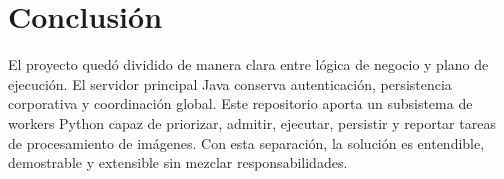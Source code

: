 \documentclass[11pt]{article}
\begin{document}
\section{Conclusión}
El proyecto quedó dividido de manera clara entre lógica de negocio y plano de ejecución. El servidor principal Java conserva autenticación, persistencia corporativa y coordinación global. Este repositorio aporta un subsistema de workers Python capaz de priorizar, admitir, ejecutar, persistir y reportar tareas de procesamiento de imágenes. Con esta separación, la solución es entendible, demostrable y extensible sin mezclar responsabilidades.
\end{document}
